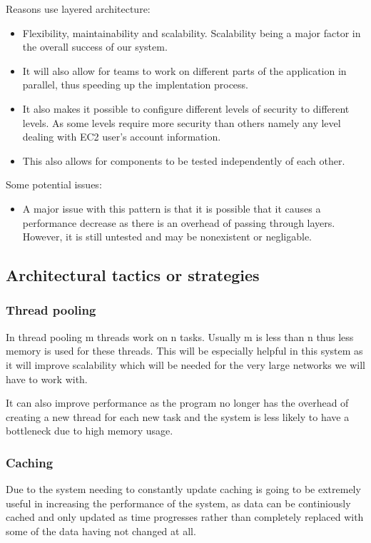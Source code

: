 \documentclass[a4paper,12pt]{report}
\begin{document}
		Reasons use layered architecture:
		\begin{itemize}
			\item Flexibility, maintainability and scalability. Scalability being a major factor in the overall success of our system. 
			\item It will also allow for teams to work on different parts of the application in parallel, thus speeding up the implentation process. 
			\item It also makes it possible to configure different levels of security to different levels. As some levels require more security than others namely any level dealing with EC2 user's account information.
			\item This also allows for components to be tested independently of each other. 
		\end{itemize}
		
		Some potential issues:
		\begin{itemize}
			\item A major issue with this pattern is that it is possible that it causes a performance decrease as there is an overhead of passing through layers. However, it is still untested and may be nonexistent or negligable.
		\end{itemize}
	\subsection{Architectural tactics or strategies}
		\subsubsection{Thread pooling}
		In thread pooling m threads work on n tasks. Usually m is less than n thus less memory is used for these threads. This will be especially helpful in this system as it will improve scalability which will be needed for the very large networks we will have to work with. 
		
		It can also improve performance as the program no longer has the overhead of creating a new thread for each new task and the system is less likely to have a bottleneck due to high memory usage.
		\subsubsection{Caching}
		Due to the system needing to constantly update caching is going to be extremely useful in increasing the performance of the system, as data can be continiously cached and only updated as time progresses rather than completely replaced with some of the data having not changed at all.
\end{document}

